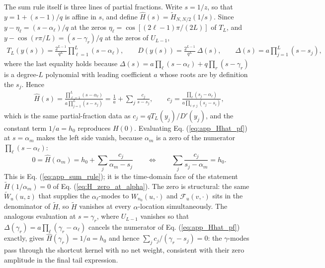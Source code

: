 \documentclass[superscriptaddress, amsmath, amssymb, aps, pre, floatfix]{revtex4-2}
\begin{document}
The sum rule itself is three lines of partial fractions.  Write \(s=1/z\), so that \(y=1+(s-1)/q\) is affine in \(s\), and define \(\widehat H(s)=\widetilde H_{N,N/2}(1/s)\).  Since \(y-\eta_\ell=(s-\alpha_\ell)/q\) at the zeros \(\eta_\ell=\cos[(2\ell-1)\pi/(2L)]\) of \(T_L\), and \(y-\cos(r\pi/L)=(s-\gamma_r)/q\) at the zeros of \(U_{L-1}\),
\begin{align}
  T_L(y(s))=\frac{2^{L-1}}{q^{L}}\prod_{\ell=1}^{L}(s-\alpha_\ell),
  \qquad
  D(y(s))=\frac{2^{L-1}}{q^{L}}\,\Delta(s),
  \qquad
  \Delta(s)=a\prod_{j=1}^{L}(s-s_j),
  \label{eq:app_s_factorizations}
\end{align}
where the last equality holds because \(\Delta(s)=a\prod_\ell(s-\alpha_\ell)+q\prod_r(s-\gamma_r)\) is a degree-\(L\) polynomial with leading coefficient \(a\) whose roots are by definition the \(s_j\).  Hence
\begin{align}
  \widehat H(s)
  =\frac{\prod_{\ell=1}^{L}(s-\alpha_\ell)}{a\prod_{j=1}^{L}(s-s_j)}
  =\frac1a+\sum_j\frac{c_j}{s-s_j},
  \qquad
  c_j=\frac{\prod_{\ell}(s_j-\alpha_\ell)}{a\prod_{i\neq j}(s_j-s_i)},
  \label{eq:app_Hhat_pf}
\end{align}
which is the same partial-fraction data as \(c_j=qT_L(y_j)/D'(y_j)\), and the constant term \(1/a=h_0\) reproduces \(H(0)\).  Evaluating Eq. (\ref{eq:app_Hhat_pf}) at \(s=\alpha_m\) makes the left side vanish, because \(\alpha_m\) is a zero of the numerator \(\prod_\ell(s-\alpha_\ell)\):
\[
  0=\widehat H(\alpha_m)=h_0+\sum_j\frac{c_j}{\alpha_m-s_j}
  \qquad\Longleftrightarrow\qquad
  \sum_j\frac{c_j}{s_j-\alpha_m}=h_0 .
\]
This is Eq. (\ref{eq:app_sum_rule}); it is the time-domain face of the statement \(\widetilde H(1/\alpha_m)=0\) of Eq. (\ref{eq:H_zero_at_alpha}).  The zero is structural: the same \(\widetilde W_u(u,z)\) that supplies the \(\alpha_\ell\)-modes to \(W_{n_0}(u,\cdot)\) and \(\mathcal F_u(v,\cdot)\) sits in the denominator of \(\widetilde H\), so \(\widetilde H\) vanishes at every \(\alpha\)-location simultaneously.  The analogous evaluation at \(s=\gamma_r\), where \(U_{L-1}\) vanishes so that \(\Delta(\gamma_r)=a\prod_\ell(\gamma_r-\alpha_\ell)\) cancels the numerator of Eq. (\ref{eq:app_Hhat_pf}) exactly, gives \(\widehat H(\gamma_r)=1/a=h_0\) and hence \(\sum_jc_j/(\gamma_r-s_j)=0\): the \(\gamma\)-modes pass through the shortcut kernel with no net weight, consistent with their zero amplitude in the final tail expression.
\end{document}
